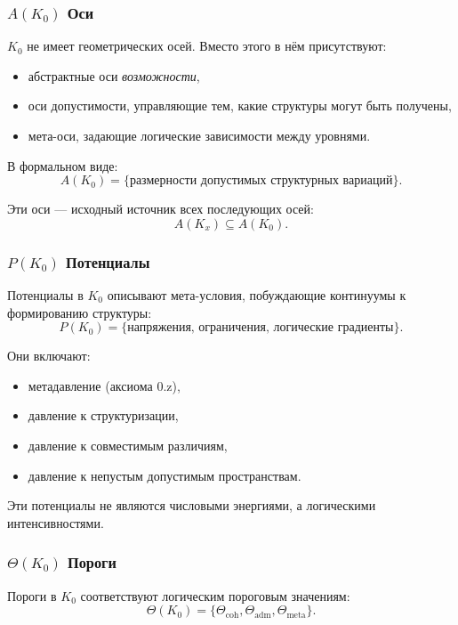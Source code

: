 \subsubsection{\texorpdfstring{$A(K_0)$}{A(K_0)} Оси}

$K_0$ не имеет геометрических осей. Вместо этого в нём присутствуют:
\begin{itemize}
    \item абстрактные оси
\emph{возможности},
    \item оси допустимости, управляющие тем, какие структуры
          могут быть получены,
    \item мета-оси, задающие логические зависимости между уровнями.
\end{itemize}

В формальном виде:
\[
A(K_0) = \{ \text{размерности допустимых структурных вариаций} \}.
\]

Эти оси — исходный источник всех последующих осей:
\[
A(K_x) \subseteq A(K_0).
\]

\subsubsection{\texorpdfstring{$P(K_0)$}{P(K_0)} Потенциалы}

Потенциалы в $K_0$ описывают мета-условия, побуждающие континуумы к
формированию структуры:
\[
P(K_0) = \{ \text{напряжения, ограничения, логические градиенты} \}.
\]

Они включают:
\begin{itemize}
    \item метадавление (аксиома 0.z),
    \item давление к структуризации,
    \item давление к совместимым различиям,
    \item давление к непустым допустимым пространствам.
\end{itemize}

Эти потенциалы не являются числовыми энергиями, а логическими
интенсивностями.

\subsubsection{\texorpdfstring{$\Theta(K_0)$}{\Theta(K_0)} Пороги}

Пороги в $K_0$ соответствуют логическим пороговым значениям:
\[
\Theta(K_0) = \{ \Theta_{\mathrm{coh}}, \Theta_{\mathrm{adm}},
                 \Theta_{\mathrm{meta}} \}.
\]

